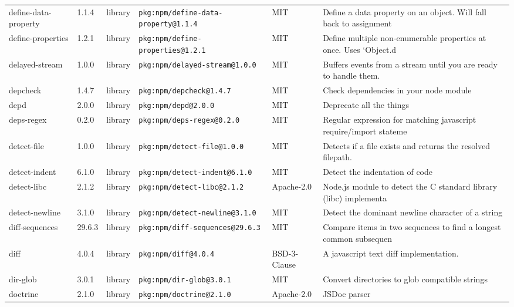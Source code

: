 \documentclass[11pt,a4paper]{article}
\begin{document}
\begin{longtable}{|p{4cm}|p{2cm}|p{1.6cm}|p{5cm}|p{1.5cm}|p{3.5cm}|}
\raggedright define-data-property & 1.1.4 & library & \small\texttt{pkg:npm/define-data-property@1.1.4} & MIT & \small Define a data property on an object. Will fall back to assignment \\
\raggedright define-properties & 1.2.1 & library & \small\texttt{pkg:npm/define-properties@1.2.1} & MIT & \small Define multiple non-enumerable properties at once. Uses `Object.d \\
\raggedright delayed-stream & 1.0.0 & library & \small\texttt{pkg:npm/delayed-stream@1.0.0} & MIT & \small Buffers events from a stream until you are ready to handle them. \\
\raggedright depcheck & 1.4.7 & library & \small\texttt{pkg:npm/depcheck@1.4.7} & MIT & \small Check dependencies in your node module \\
\raggedright depd & 2.0.0 & library & \small\texttt{pkg:npm/depd@2.0.0} & MIT & \small Deprecate all the things \\
\raggedright deps-regex & 0.2.0 & library & \small\texttt{pkg:npm/deps-regex@0.2.0} & MIT & \small Regular expression for matching javascript require/import stateme \\
\raggedright detect-file & 1.0.0 & library & \small\texttt{pkg:npm/detect-file@1.0.0} & MIT & \small Detects if a file exists and returns the resolved filepath. \\
\raggedright detect-indent & 6.1.0 & library & \small\texttt{pkg:npm/detect-indent@6.1.0} & MIT & \small Detect the indentation of code \\
\raggedright detect-libc & 2.1.2 & library & \small\texttt{pkg:npm/detect-libc@2.1.2} & Apache-2.0 & \small Node.js module to detect the C standard library (libc) implementa \\
\raggedright detect-newline & 3.1.0 & library & \small\texttt{pkg:npm/detect-newline@3.1.0} & MIT & \small Detect the dominant newline character of a string \\
\raggedright diff-sequences & 29.6.3 & library & \small\texttt{pkg:npm/diff-sequences@29.6.3} & MIT & \small Compare items in two sequences to find a longest common subsequen \\
\raggedright diff & 4.0.4 & library & \small\texttt{pkg:npm/diff@4.0.4} & BSD-3-Clause & \small A javascript text diff implementation. \\
\raggedright dir-glob & 3.0.1 & library & \small\texttt{pkg:npm/dir-glob@3.0.1} & MIT & \small Convert directories to glob compatible strings \\
\raggedright doctrine & 2.1.0 & library & \small\texttt{pkg:npm/doctrine@2.1.0} & Apache-2.0 & \small JSDoc parser \\

\end{longtable}
\end{document}
